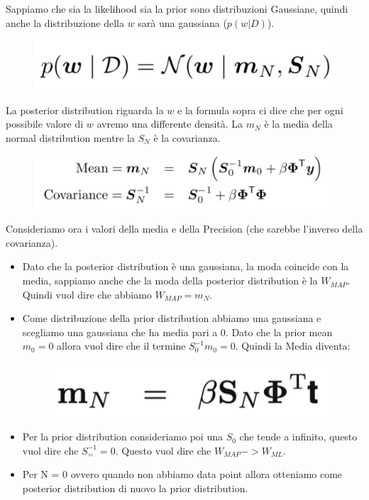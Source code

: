 \documentclass[14pt]{extreport}
\begin{document}
Sappiamo che sia la likelihood sia la prior sono distribuzioni Gaussiane, quindi anche la distribuzione della $w$ sarà una gaussiana ($p(w|D)$).

\begin{figure}[H]
\centering
\includegraphics[width=0.7\linewidth]{127.jpeg}
\end{figure}

La posterior distribution riguarda la $w$ e la formula sopra ci dice che per ogni possibile valore di $w$ avremo una differente densità. La $m_N$ è la
media della normal distribution mentre la $S_N$ è la covarianza.

\begin{figure}[H]
\centering
\includegraphics[width=0.6\linewidth]{128.jpeg}
\end{figure}

Consideriamo ora i valori della media e della Precision (che sarebbe l'inverso della covarianza).
\begin{itemize}
\item Dato che la posterior distribution è una gaussiana, la moda coincide con la media, sappiamo anche che la moda della posterior distribution è la
$W_{MAP}$. Quindi vuol dire che abbiamo $W_{MAP} = m_N$.
\item Come distribuzione della prior distribution abbiamo una gaussiana e scegliamo una gaussiana che ha media pari a 0. Dato che la prior mean $m_0 =
0$ allora vuol dire che il termine $S_0^{-1}m_0 = 0$. Quindi la Media diventa: \begin{figure}[H]
\centering
\includegraphics[width=0.3\linewidth]{129.jpeg}
\end{figure}
\item Per la prior distribution consideriamo poi una $S_0$ che tende a infinito, questo vuol dire che $S_=^{-1} = 0$. Questo vuol dire che $W_{MAP}->
W_{ML}$.
\item Per N = 0 ovvero quando non abbiamo data point allora otteniamo come posterior distribution di nuovo la prior distribution.
\end{itemize}
\end{document}

